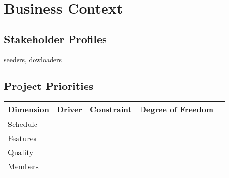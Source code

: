 \documentclass[letter]{scrartcl}
\begin{document}


\section{Business Context}
\subsection{Stakeholder Profiles}
seeders, dowloaders

\subsection{Project Priorities}
\begin{tabular}{| l | l | l | l | l |}
\hline
\textbf{Dimension} & \textbf{Driver} & \textbf{Constraint} & \textbf{Degree of Freedom} \\
\hline
\hline
Schedule & & & \\
\hline
Features & & & \\
\hline
Quality  & & & \\
\hline
Members  & & & \\
\end{tabular}
\end{document}
